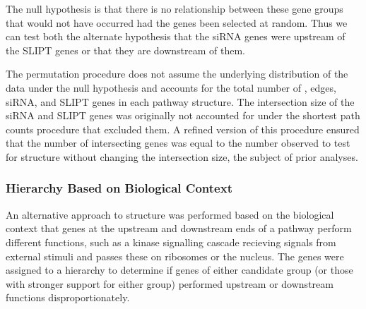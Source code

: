 The null hypothesis is that there is no relationship between these gene groups that would not have occurred had the genes been selected at random. Thus we can test both the alternate hypothesis that the \gls{siRNA} genes were upstream of the \gls{SLIPT} genes or that they are downstream of them.

The permutation procedure does not assume the underlying distribution of the data under the null hypothesis and accounts for the total number of , \glspl{edge}, \gls{siRNA}, and \gls{SLIPT} genes in each pathway  structure. The intersection size of the \gls{siRNA} and \gls{SLIPT} genes was originally not accounted for under the \gls{shortest path} counts procedure that excluded them. A refined version of this procedure ensured that the number of intersecting genes was equal to the number observed to test for  structure without changing the intersection size, the subject of prior analyses.

\subsubsection{Hierarchy Based on Biological Context} \label{methods:pathway_rank}
An alternative approach to  structure was performed based on the biological context that genes at the upstream and downstream ends of a pathway perform different functions, such as a kinase signalling cascade recieving signals from external stimuli and passes these on ribosomes or the nucleus. The genes were assigned to a hierarchy to determine if genes of either candidate group (or those with stronger support for either group) performed upstream or downstream functions disproportionately.

